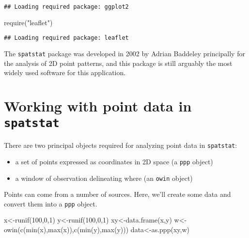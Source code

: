 \documentclass[
]{book}
\newenvironment{Shaded}{\begin{snugshade}}{\end{snugshade}}
\newcommand{\DecValTok}[1]{\textcolor[rgb]{0.00,0.00,0.81}{#1}}
\newcommand{\FunctionTok}[1]{\textcolor[rgb]{0.00,0.00,0.00}{#1}}
\newcommand{\NormalTok}[1]{#1}
\newcommand{\OtherTok}[1]{\textcolor[rgb]{0.56,0.35,0.01}{#1}}
\newcommand{\StringTok}[1]{\textcolor[rgb]{0.31,0.60,0.02}{#1}}
\providecommand{\tightlist}{%
  \setlength{\itemsep}{0pt}\setlength{\parskip}{0pt}}
\begin{document}
\begin{verbatim}
## Loading required package: ggplot2
\end{verbatim}

\begin{Shaded}
\begin{Highlighting}[]
\FunctionTok{require}\NormalTok{(}\StringTok{"leaflet"}\NormalTok{)}
\end{Highlighting}
\end{Shaded}

\begin{verbatim}
## Loading required package: leaflet
\end{verbatim}

The \texttt{spatstat} package was developed in 2002 by Adrian Baddeley principally for the analysis of 2D point patterns, and this package is still arguably the most widely used software for this application.

\hypertarget{working-with-point-data-in-spatstat}{%
\chapter{\texorpdfstring{Working with point data in \texttt{spatstat}}{Working with point data in spatstat}}\label{working-with-point-data-in-spatstat}}

There are two principal objects required for analyzing point data in \texttt{spatstat}:

\begin{itemize}
\tightlist
\item
  a set of points expressed as coordinates in 2D space (a \texttt{ppp} object)
\item
  a window of observation delineating where (an \texttt{owin} object)
\end{itemize}

Points can come from a number of sources. Here, we'll create some data and convert them into a \texttt{ppp} object.

\begin{Shaded}
\begin{Highlighting}[]
\NormalTok{x}\OtherTok{\textless{}{-}}\FunctionTok{runif}\NormalTok{(}\DecValTok{100}\NormalTok{,}\DecValTok{0}\NormalTok{,}\DecValTok{1}\NormalTok{)}
\NormalTok{y}\OtherTok{\textless{}{-}}\FunctionTok{runif}\NormalTok{(}\DecValTok{100}\NormalTok{,}\DecValTok{0}\NormalTok{,}\DecValTok{1}\NormalTok{)}
\NormalTok{xy}\OtherTok{\textless{}{-}}\FunctionTok{data.frame}\NormalTok{(x,y)}
\NormalTok{w}\OtherTok{\textless{}{-}}\FunctionTok{owin}\NormalTok{(}\FunctionTok{c}\NormalTok{(}\FunctionTok{min}\NormalTok{(x),}\FunctionTok{max}\NormalTok{(x)),}\FunctionTok{c}\NormalTok{(}\FunctionTok{min}\NormalTok{(y),}\FunctionTok{max}\NormalTok{(y)))}
\NormalTok{data}\OtherTok{\textless{}{-}}\FunctionTok{as.ppp}\NormalTok{(xy,w)}
\end{Highlighting}
\end{Shaded}
\end{document}
